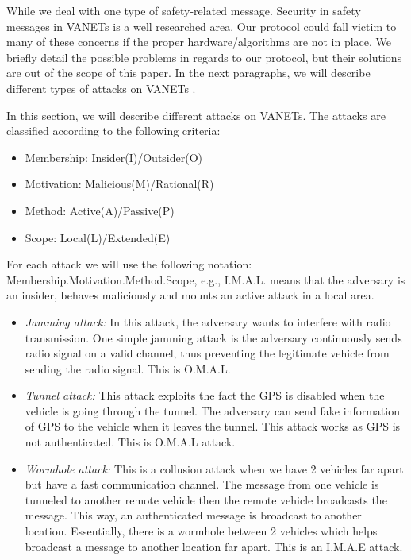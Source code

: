 \documentclass{IEEEtran}
\begin{document}
While we deal with one type of safety-related message. Security in safety messages in VANETs is a well researched area. Our protocol could fall victim to many of these concerns if the proper hardware/algorithms are not in place. We briefly detail the possible problems in regards to our protocol, but their solutions are out of the scope of this paper. In the next paragraphs, we will describe different types of attacks on VANETs \cite{SecurityVANET, SecurityWSN}.

In this section, we will describe different attacks on VANETs. The attacks are classified according to the following criteria:
\begin{itemize}
\item Membership: Insider(I)/Outsider(O)
\item Motivation: Malicious(M)/Rational(R)
\item Method: Active(A)/Passive(P)
\item Scope: Local(L)/Extended(E)
\end{itemize}
For each attack we will use the following notation: Membership.Motivation.Method.Scope, e.g., I.M.A.L. means that the adversary is an insider, behaves maliciously and mounts an active attack in a local area.

\begin{itemize}
\item \emph{Jamming attack:} In this attack, the adversary wants to interfere with radio transmission. One simple jamming attack is the adversary continuously sends radio signal on a valid channel, thus preventing the legitimate vehicle from sending the radio signal. This is O.M.A.L.
\item \emph{Tunnel attack:} This attack exploits the fact the GPS is disabled when the vehicle is going through the tunnel. The adversary can send fake information of GPS to the vehicle when it leaves the tunnel. This attack works as GPS is not authenticated. This is O.M.A.L attack.
\item \emph{Wormhole attack:} This is a collusion attack when we have 2 vehicles far apart but have a fast communication channel. The message from one vehicle is tunneled to another remote vehicle then the remote vehicle broadcasts the message. This way, an authenticated message is broadcast to another location. Essentially, there is a wormhole between 2 vehicles which helps broadcast a message to another location far apart. This is an I.M.A.E attack.
\end{itemize}
\end{document}
